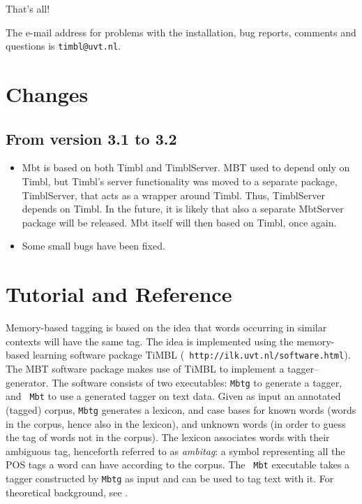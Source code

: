 \documentclass{report}
\begin{document}
That's all!

The e-mail address for problems with the installation, bug reports,
comments and questions is {\tt timbl@uvt.nl}.

\chapter{Changes}
\label{changes}
\section{From version 3.1 to 3.2}

\begin{itemize}
\item Mbt is based on both Timbl and TimblServer. MBT used to depend
  only on Timbl, but Timbl's server functionality was moved to a
  separate package, TimblServer, that acts as a wrapper around
  Timbl. Thus, TimblServer depends on Timbl.  In the future, it is
  likely that also a separate MbtServer package will be released. Mbt
  itself will then based on Timbl, once again.
\item Some small bugs have been fixed.

\end{itemize}

\chapter{Tutorial and Reference}
\label{tutorial}

Memory-based tagging is based on the idea that words occurring in
similar contexts will have the same tag. The idea is implemented using
the memory-based learning software package TiMBL ({\tt
  http://ilk.uvt.nl/software.html}).  The MBT software package
makes use of TiMBL to implement a tagger--generator.  The software
consists of two executables: {\tt Mbtg} to generate a tagger, and {\tt
  Mbt} to use a generated tagger on text data.  Given as input an
annotated (tagged) corpus, {\tt Mbtg} generates a lexicon, and case
bases for known words (words in the corpus, hence also in the
lexicon), and unknown words (in order to guess the tag of words
not in the corpus). The lexicon associates words with their ambiguous
tag, henceforth referred to as {\em ambitag}: a symbol representing
all the POS tags a word can have according to the corpus. The {\tt
  Mbt} executable takes a tagger constructed by {\tt Mbtg} as input
and can be used to tag text with it.  For theoretical background, see
\cite{Daelemans+96,Zavrel+99}.
\end{document}
